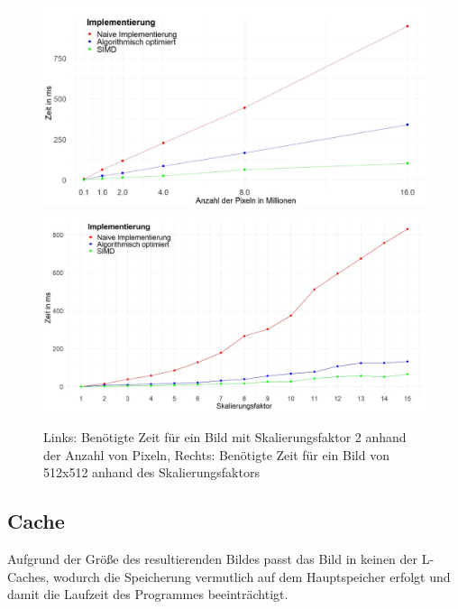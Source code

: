\documentclass[course=erap]{aspdoc}
\begin{document}
\begin{figure}[ht]
    \centering
    \includegraphics[scale=0.125]{assets/speed.png}
    \includegraphics[scale=0.125]{assets/speed2.png}
    \caption{Links: Benötigte Zeit für ein Bild mit Skalierungsfaktor 2 anhand der Anzahl von Pixeln, Rechts: Benötigte Zeit für ein Bild von 512x512 anhand des Skalierungsfaktors}
    \label{fig:speed}
\end{figure}
\subsection{Cache}
Aufgrund der Größe des resultierenden Bildes passt das Bild in keinen der L-Caches, wodurch die Speicherung vermutlich auf dem Hauptspeicher erfolgt und damit die Laufzeit des Programmes beeinträchtigt.
\end{document}

